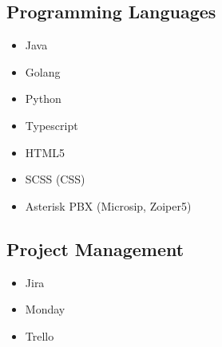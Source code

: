 
\begin{cventries}
\begin{row}[cellsep=0.75cm]{2}{2}
    \begin{cell}{1}
	\section*{Programming Languages}
	\vspace{-1.5ex}
    \begin{itemize}
        \item {Java}
        \item {Golang}
        \item {Python}
        \item {Typescript}
        \item {HTML5}
        \item {SCSS (CSS)}
        \item {Asterisk PBX (Microsip, Zoiper5)}
    \end{itemize}
	\end{cell}
	\begin{cell}{1}
	\section*{Project Management}
	\vspace{-1.5ex}
    \begin{itemize}
        \item {Jira}
        \item {Monday}
        \item {Trello}
    \end{itemize}
	\end{cell}
\end{row}


\end{cventries}

